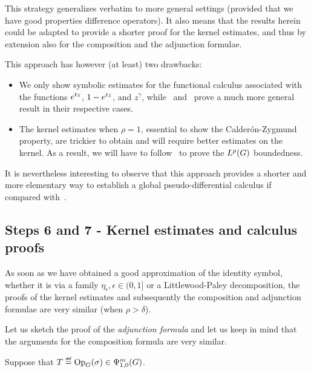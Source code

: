 This strategy generalizes verbatim to more general settings
(provided that we have good properties difference operators).
It also means that the results herein could be adapted
to provide a shorter proof for the kernel estimates,
and thus by extension also for the composition and the adjunction formulae.

This approach has however (at least) two drawbacks:
\begin{itemize}
    \item
        We only show symbolic estimates for the functional calculus associated with the functions $e^{t z}$,
        $1 - e^{t z}$, and $z^\gamma$,
        while~\cite{FischerRuzhansky16} and~\cite{Fischer2015} prove a much more general result in their respective cases.
    \item
        The kernel estimates when $\rho = 1$,
        essential to show the Calder\'on-Zygmund property,
        are trickier to obtain
        and will require better estimates on the kernel.
        As a result,
        we will have to follow~\cite{Fischer2015}
        to prove the ${L^{p} (G)}$ boundedness.
\end{itemize}

It is nevertheless interesting to observe that this approach provides a shorter and more elementary way
to establish a global pseudo-differential calculus
if compared with~\cite{Fischer2015,FischerRuzhansky16}.

\subsection*{Steps 6 and 7 - Kernel estimates and calculus proofs}

As soon as we have obtained a good approximation of the identity symbol,
whether it is via a family $\eta_\epsilon, \epsilon \in (0, 1]$
or a Littlewood-Paley decomposition,
the proofs of the kernel estimates and subsequently the composition and adjunction formulae are very similar (when $\rho > \delta$).

Let us sketch the proof of the \emph{adjunction formula}
and let us keep in mind that the arguments for the composition formula are very similar.

Suppose that $T \defeq \Op(\sigma) \in \OperatorClass m {1, 0}$.

